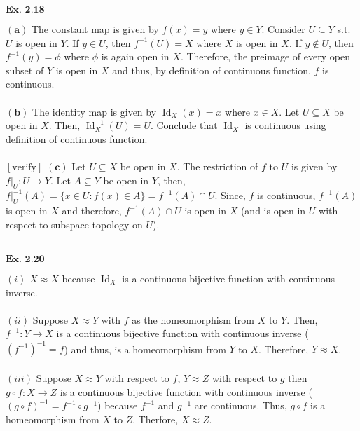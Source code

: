 \documentclass{article}
\begin{document}
${\textbf{Ex. 2.18}}$

$\mathbf{(a)}$ The constant map is given by $f(x) = y$ where $y \in Y$. Consider $U \subseteq Y$ s.t. $U$ is open in $Y$. If $y \in U$, then $f^{-1}(U) = X$ where $X$ is open in $X$. If $y \not\in U$, then $f^{-1}(y) = \phi$ where $\phi$ is again open in $X$. Therefore, the preimage of every open subset of $Y$ is open in $X$ and thus, by definition of continuous function, $f$ is continuous.\\~\\

$\mathbf{(b)}$ The identity map is given by $\operatorname{Id}_{X}(x) = x$ where $x \in X$. Let $U \subseteq X$ be open in $X$. Then, $\operatorname{Id}_{X}^{-1}(U) = U$. Conclude that $\operatorname{Id}_{X}$ is continuous using definition of continuous function.\\~\\

$[\text{verify}]$ $\mathbf{(c)}$ Let $U \subseteq X$ be open in $X$. The restriction of $f$ to $U$ is given by $f\big\vert_{U}:U \rightarrow Y$. Let $A \subseteq Y$ be open in $Y$, then, $f\big\vert_{U}^{-1}(A) = \{x \in U: f(x) \in A\} = f^{-1}(A)\cap U$. Since, $f$ is continuous, $f^{-1}(A)$ is open in $X$ and therefore, $f^{-1}(A)\cap U$ is open in $X$ (and is open in $U$ with respect to subspace topology on $U$).\\~\\

\vspace{0.2in}

${\textbf{Ex. 2.20}}$

$(i)$ $X \approx X$ because $\operatorname{Id}_{X}$ is a continuous bijective function with continuous inverse.\\~\\

$(ii)$ Suppose $X \approx Y$ with $f$ as the homeomorphism from $X$ to $Y$. Then, $f^{-1}:Y \rightarrow X$ is a continuous bijective function with continuous inverse ($(f^{-1})^{-1} = f$) and thus, is a homeomorphism from $Y$ to $X$. Therefore, $Y \approx X$.\\~\\

$(iii)$ Suppose $X \approx Y$ with respect to $f$, $Y \approx Z$ with respect to $g$ then $g \circ f: X \rightarrow Z$ is a continuous bijective function with continuous inverse ($(g \circ f)^{-1} = f^{-1} \circ g^{-1}$) because $f^{-1}$ and $g^{-1}$ are continuous. Thus, $g \circ f$ is a homeomorphism from $X$ to $Z$. Therfore, $X \approx Z$.
\end{document}
